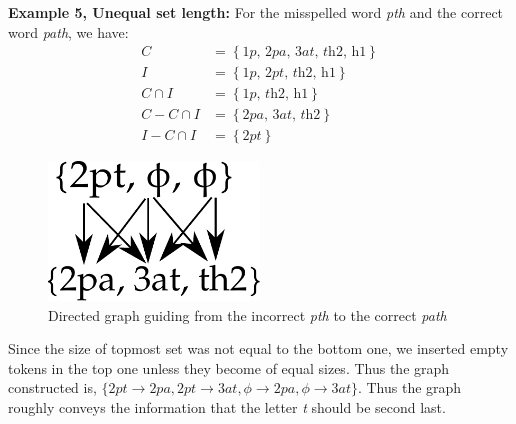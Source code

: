 	\textbf{Example 5, Unequal set length:} For the misspelled word \textit{pth} and the correct word \textit{path}, we have:
	\begin{equation*}
	\begin{aligned}
	C &= \left\lbrace \textit{1p, 2pa, 3at, th2, h1} \right\rbrace \\
	I &= \left\lbrace \textit{1p, 2pt, th2, h1} \right\rbrace \\
	C \cap I &= \left\lbrace \textit{1p, th2, h1} \right\rbrace \\
	C - C \cap I &= \left\lbrace \textit{2pa, 3at, th2} \right\rbrace \\
	I - C \cap I &= \left\lbrace \textit{2pt} \right\rbrace
	\end{aligned}
	\end{equation*}
	\begin{figure}[h]
		\centering
		\includegraphics[width=0.5\textwidth]{gfx/ex5.pdf}
		\caption{Directed graph guiding from the incorrect \textit{pth} to the correct \textit{path}}
		\label{e5}
	\end{figure}
	
	Since the size of topmost set was not equal to the bottom one, we inserted empty tokens in the top one unless they become of equal sizes.
	Thus the graph constructed is, $\lbrace \textit{2pt} \rightarrow  \textit{2pa}, \textit{2pt} \rightarrow  \textit{3at}, \phi \rightarrow  \textit{2pa}, \phi \rightarrow  \textit{3at} \rbrace$.
	Thus the graph roughly conveys the information that the letter \textit{t} should be second last.
	
